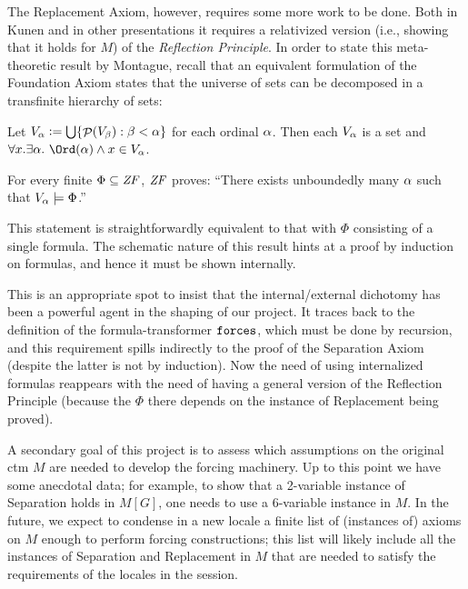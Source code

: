 The Replacement Axiom, however, requires some more work to be
done. Both in Kunen and in other presentations \cite{neeman-course}
it requires a relativized version (i.e., showing that it holds for $M$) of
the \emph{Reflection Principle}. In order to state this meta-theoretic
result by Montague, recall that
an equivalent formulation of the Foundation Axiom states that the 
universe of sets can be decomposed in a transfinite hierarchy of
sets: 
\begin{theorem}
  Let $V_{\alpha}\mathrel{\mathop:}=\mathop{\textstyle\bigcup}\{\mathop{\mathcal{P}}(V_\beta) : \beta<\alpha\}$ for each ordinal
  $\alpha$. Then each $V_\alpha$ is a set and 
  $\forall x. \exists\al .\ \Ord(\al) \y x\in V_\al$.  
\end{theorem}
\begin{theorem}\label{th:reflection-principle}
  For every finite $\Phi\subseteq\mathit{ZF}$, $\mathit{ZF}$ proves: ``There exists
  unboundedly many $\alpha$ such that $V_\alpha\models \Phi$.''
\end{theorem}

This statement is straightforwardly equivalent to that with $\Phi$
consisting of a single formula. The schematic nature of this result
hints at a proof by induction on formulas, and hence it must be shown
internally. 

This  is an appropriate spot to insist that the internal/external
dichotomy has been a powerful agent in the shaping of our
project. It traces back to the definition of the formula-transformer
$\mathop{\mathtt{forces}}$, which must be done by recursion, and this requirement
spills indirectly to the proof of the Separation Axiom (despite the
latter
is not by induction). Now the need of using internalized formulas
reappears with the need of having a general version of the Reflection
Principle (because the $\Phi$ there depends on the instance of Replacement
being proved).

A secondary goal of this project is to assess which assumptions on the
original ctm $M$ are needed to develop the forcing machinery. Up to this
point we have some anecdotal data; for example, to show that a
2-variable instance of Separation holds in $M[G]$, one needs to use a
6-variable instance in $M$. In the future, we expect to condense in a
new locale a finite list of (instances of) axioms on $M$ enough to
perform forcing constructions; this list will likely include all the
instances of Separation and Replacement in $M$ that are needed to
satisfy the requirements of the locales in the
 session.  

